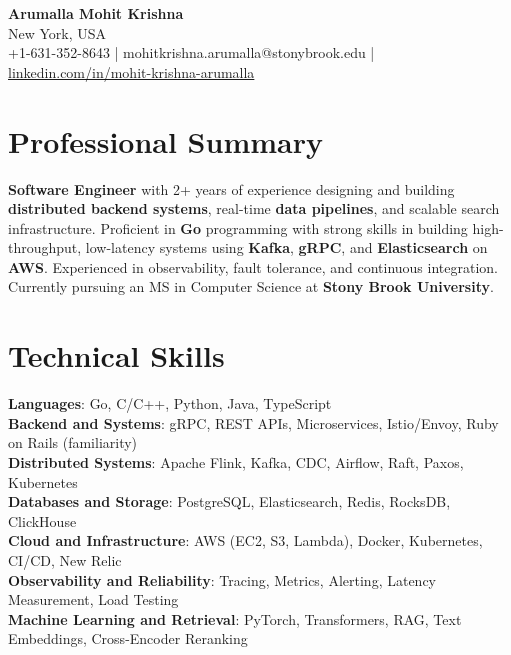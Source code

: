 \documentclass[letterpaper,11pt]{article}
\begin{document}
\begin{center}
  {\Large \textbf{Arumalla Mohit Krishna}} \\
  New York, USA \\
  +1-631-352-8643 \enspace | \enspace mohitkrishna.arumalla@stonybrook.edu \enspace | \enspace \href{https://www.linkedin.com/in/mohit-krishna-arumalla}{linkedin.com/in/mohit-krishna-arumalla}
\end{center}

\section{Professional Summary}
  \begin{itemize}[leftmargin=0.15in, label={}]
    \small{\item{
     \textbf{Software Engineer} with 2+ years of experience designing and building \textbf{distributed backend systems}, real-time \textbf{data pipelines}, and scalable search infrastructure. Proficient in \textbf{Go} programming with strong skills in building high-throughput, low-latency systems using \textbf{Kafka}, \textbf{gRPC}, and \textbf{Elasticsearch} on \textbf{AWS}. Experienced in observability, fault tolerance, and continuous integration. Currently pursuing an MS in Computer Science at \textbf{Stony Brook University}.
    }}
  \end{itemize}
\vspace{-16pt}

\section{Technical Skills}
 \begin{itemize}[leftmargin=0.15in, label={}]
    \small{\item{
     \textbf{Languages}: Go, C/C++, Python, Java, TypeScript \\
     \textbf{Backend and Systems}: gRPC, REST APIs, Microservices, Istio/Envoy, Ruby on Rails (familiarity) \\
     \textbf{Distributed Systems}: Apache Flink, Kafka, CDC, Airflow, Raft, Paxos, Kubernetes \\
     \textbf{Databases and Storage}: PostgreSQL, Elasticsearch, Redis, RocksDB, ClickHouse \\
     \textbf{Cloud and Infrastructure}: AWS (EC2, S3, Lambda), Docker, Kubernetes, CI/CD, New Relic \\
     \textbf{Observability and Reliability}: Tracing, Metrics, Alerting, Latency Measurement, Load Testing \\
     \textbf{Machine Learning and Retrieval}: PyTorch, Transformers, RAG, Text Embeddings, Cross-Encoder Reranking
    }}
 \end{itemize}
\vspace{-16pt}
\end{document}

